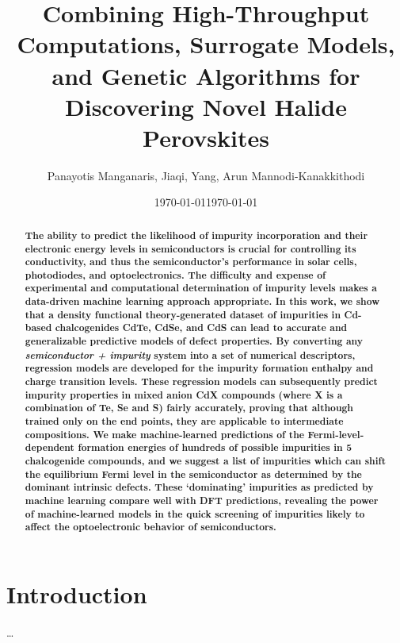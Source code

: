 \documentclass[11pt]{article}
\date{\today}
\title{Combining High-Throughput Computations, Surrogate Models, and Genetic Algorithms for Discovering Novel Halide Perovskites}
\begin{document}
\maketitle
\tableofcontents

\author{Panayotis Manganaris, Jiaqi, Yang, Arun Mannodi-Kanakkithodi}
%
\date{\today}

\maketitle

\begin{abstract}
\textbf{
The ability to predict the likelihood of impurity incorporation and
their electronic energy levels in semiconductors is crucial for
controlling its conductivity, and thus the semiconductor's performance
in solar cells, photodiodes, and optoelectronics. The difficulty and
expense of experimental and computational determination of impurity
levels makes a data-driven machine learning approach appropriate. In
this work, we show that a density functional theory-generated dataset
of impurities in Cd-based chalcogenides CdTe, CdSe, and CdS can lead
to accurate and generalizable predictive models of defect
properties. By converting any \textit{semiconductor + impurity} system
into a set of numerical descriptors, regression models are developed
for the impurity formation enthalpy and charge transition
levels. These regression models can subsequently predict impurity
properties in mixed anion CdX compounds (where X is a combination of
Te, Se and S) fairly accurately, proving that although trained only on
the end points, they are applicable to intermediate compositions. We
make machine-learned predictions of the Fermi-level-dependent
formation energies of hundreds of possible impurities in 5
chalcogenide compounds, and we suggest a list of impurities which can
shift the equilibrium Fermi level in the semiconductor as determined
by the dominant intrinsic defects. These `dominating' impurities as
predicted by machine learning compare well with DFT predictions,
revealing the power of machine-learned models in the quick screening
of impurities likely to affect the optoelectronic behavior of
semiconductors.
}
\end{abstract}
\section{Introduction}
\label{sec:orgee9d0b6}
\ldots{}\\
\end{document}
